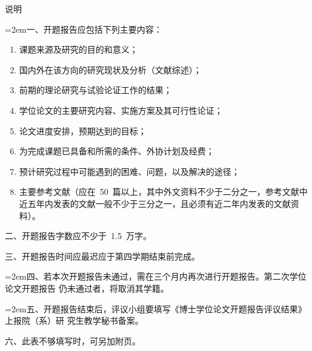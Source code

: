 {    
\newpage
\thispagestyle{empty}
\vspace*{2em}
\begin{center}
  \heiti{}说\hspace{3em}明
\end{center}
\vspace*{40pt}
	\renewcommand{\arraystretch}{1.25}
    {\songti{}
    \hangindent=2em\noindent 一、开题报告应包括下列主要内容：
    \begin{enumerate}[leftmargin=36pt]
    \item 课题来源及研究的目的和意义；
    \item 国内外在该方向的研究现状及分析（文献综述）；
    \item 前期的理论研究与试验论证工作的结果；
    \item 学位论文的主要研究内容、实施方案及其可行性论证；
    \item 论文进度安排，预期达到的目标；
    \item 为完成课题已具备和所需的条件、外协计划及经费；
    \item 预计研究过程中可能遇到的困难、问题，以及解决的途径；
    \item 主要参考文献（应在~50~篇以上，其中外文资料不少于二分之一，参考文献中近五年内发表的文献一般不少于三分之一，且必须有近二年内发表的文献资料）。
    \end{enumerate}
    \noindent 二、开题报告字数应不少于~1.5~万字。

    \noindent 三、开题报告时间应最迟应于第四学期结束前完成。

    \hangindent=2em\noindent 四、若本次开题报告未通过，需在三个月内再次进行开题报告。第二次学位论文开题报告
    仍未通过者，将取消其学籍。

    \hangindent=2em\noindent 五、开题报告结束后，评议小组要填写《博士学位论文开题报告评议结果》上报院（系）研
    究生教学秘书备案。

    \noindent 六、此表不够填写时，可另加附页。
    }
	\renewcommand{\arraystretch}{1}
    \clearpage
}
\fi

